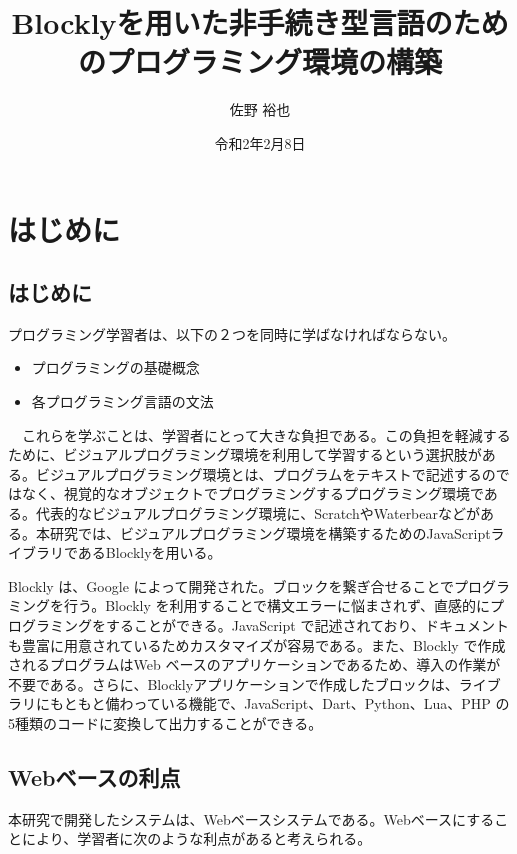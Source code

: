 \documentclass{risepaper}
\title {Blocklyを用いた非手続き型言語のためのプログラミング環境の構築}
\author{佐野 裕也}
\date{令和2年2月8日}
\begin{document}
 
\maketitle
                                                          
   \chapter{はじめに}
   
   \section{はじめに}


  プログラミング学習者は、以下の２つを同時に学ばなければならない。
  
\begin{itemize}
\item プログラミングの基礎概念
\item 各プログラミング言語の文法
\end{itemize} 

　これらを学ぶことは、学習者にとって大きな負担である。この負担を軽減するために、ビジュアルプログラミング環境を利用して学習するという選択肢がある。ビジュアルプログラミング環境とは、プログラムをテキストで記述するのではなく、視覚的なオブジェクトでプログラミングするプログラミング環境である。代表的なビジュアルプログラミング環境に、Scratch\cite{Scratch}やWaterbear\cite{waterbear}などがある。本研究では、ビジュアルプログラミング環境を構築するためのJavaScriptライブラリであるBlockly\cite{Blockly}を用いる。
  
Blockly は、Google によって開発された。ブロックを繋ぎ合せることでプログラミングを行う。Blockly を利用することで構文エラーに悩まされず、直感的にプログラミングをすることができる。JavaScript で記述されており、ドキュメントも豊富に用意されているためカスタマイズが容易である。また、Blockly で作成されるプログラムはWeb ベースのアプリケーションであるため、導入の作業が不要である。さらに、Blocklyアプリケーションで作成したブロックは、ライブラリにもともと備わっている機能で、JavaScript、Dart、Python、Lua、PHP の5種類のコードに変換して出力することができる。

   \section{Webベースの利点}
   
本研究で開発したシステムは、Webベースシステムである。Webベースにすることにより、学習者に次のような利点があると考えられる。
\end{document}
